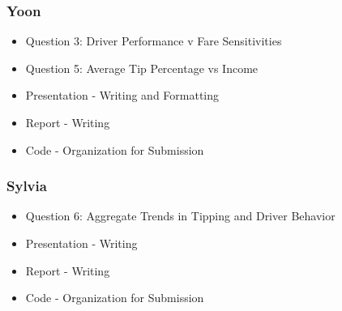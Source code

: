 \documentclass[twoside]{article}
\begin{document}
\begin{multicols}{2}
\subsubsection*{Yoon}
\begin{itemize}
  \item Question 3: Driver Performance v Fare Sensitivities
  \item Question 5: Average Tip Percentage vs Income
  \item Presentation - Writing and Formatting
  \item Report - Writing
  \item Code - Organization for Submission
\end{itemize}

\subsubsection*{Sylvia}
\begin{itemize}
  \item Question 6: Aggregate Trends in Tipping and Driver Behavior
  \item Presentation - Writing
  \item Report - Writing
  \item Code - Organization for Submission
\end{itemize}

\end{multicols}
\end{document}
